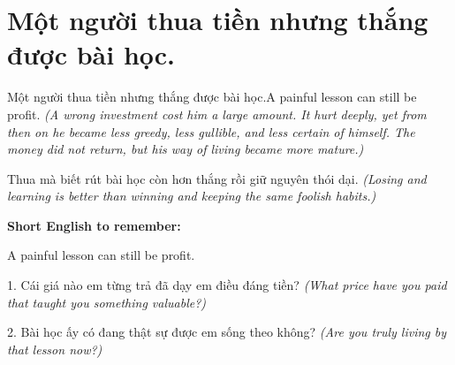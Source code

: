 \section{Một người thua tiền nhưng thắng được bài học.}
\begin{truyen}{Một người thua tiền nhưng thắng được bài học.}{A painful lesson can still be profit.}
\textit{(A wrong investment cost him a large amount. It hurt deeply, yet from then on he became less greedy, less gullible, and less certain of himself. The money did not return, but his way of living became more mature.)}
\end{truyen}
\begin{baihoc}
Thua mà biết rút bài học còn hơn thắng rồi giữ nguyên thói dại.
\textit{(Losing and learning is better than winning and keeping the same foolish habits.)}
\end{baihoc}
\begin{ghinhoanh}\textbf{Short English to remember:}

A painful lesson can still be profit.
\end{ghinhoanh}
\begin{tuhocnhanh}
1. Cái giá nào em từng trả đã dạy em điều đáng tiền? \textit{(What price have you paid that taught you something valuable?)}

2. Bài học ấy có đang thật sự được em sống theo không? \textit{(Are you truly living by that lesson now?)}
\end{tuhocnhanh}
\ngancach

